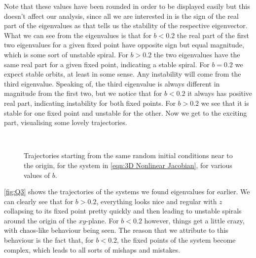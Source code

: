 \documentclass[12pt]{article}
\numberwithin{equation}{section}
\numberwithin{figure}{section}
\numberwithin{table}{section}
\begin{document}
    Note that these values have been rounded in order to be displayed easily but this doesn't 
    affect our analysis, since all we are interested in is the sign of the real part of the 
    eigenvalues as that tells us the stability of the respective eigenvector. What we can see 
    from the eigenvalues is that for $b<0.2$ the real part of the first two eigenvalues for a 
    given fixed point have opposite sign but equal magnitude, which is some sort of unstable 
    spiral. For $b>0.2$ the two eigenvalues have the same real part for a given fixed point, 
    indicating a stable spiral. For $b=0.2$ we expect stable orbits, at least in some sense. 
    Any instability will come from the third eigenvalue. Speaking of, the third eigenvalue is 
    always different in magnitude from the first two, but we notice that for $b<0.2$ it always 
    has positive real part, indicating instability for both fixed points. For $b>0.2$ we see 
    that it is stable for one fixed point and unstable for the other. 
    \newline
    \newline
    Now we get to the exciting part, visualising some lovely trajectories. 
    \begin{figure}[H]%
        \centering
        \,
        \,
        \,
        \,
        \,
        \,
        \,
        \caption{Trajectories starting from the same random initial conditions near to the 
        origin, for the system in \autoref{eqn:3D Nonlinear Jacobian}, for various values of $b$.}
        \label{fig:Q3}
    \end{figure}
    \autoref{fig:Q3} shows the trajectories of the systems we found eigenvalues for earlier. We 
    can clearly see that for $b>0.2$, everything looks nice and regular with $z$ collapsing to 
    its fixed point pretty quickly and then leading to unstable spirals around the origin of 
    the $xy$-plane. For $b<0.2$ however, things get a little crazy, with chaos-like behaviour 
    being seen. The reason that we attribute to this behaviour is the fact that, for $b<0.2$, 
    the fixed points of the system become complex, which leads to all sorts of mishaps and mistakes. 
\end{document}
